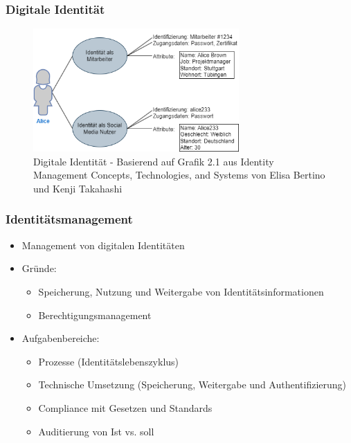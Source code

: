 \documentclass[11pt]{beamer}
\begin{document}
\begin{frame}
  \frametitle{Digitale Identität}
  \begin{figure}[H]
    \centering
    \includegraphics[width=0.7\textwidth]{assets/identity.png}
    \caption{Digitale Identität - Basierend auf Grafik 2.1 aus \glqq{}Identity Management Concepts, Technologies, and Systems\grqq{} von Elisa Bertino und Kenji Takahashi}
  \end{figure}
\end{frame}
\begin{frame}
  \frametitle{Identitätsmanagement}
  \begin{itemize}
    \item Management von digitalen Identitäten
    \item Gründe:
          \begin{itemize}
            \item Speicherung, Nutzung und Weitergabe von Identitätsinformationen
            \item Berechtigungsmanagement
          \end{itemize}
    \item Aufgabenbereiche:
          \begin{itemize}
            \item Prozesse (Identitätslebenszyklus)
            \item Technische Umsetzung (Speicherung, Weitergabe und Authentifizierung)~
            \item Compliance mit Gesetzen und Standards~
            \item Auditierung von Ist vs. soll~
          \end{itemize}
  \end{itemize}
\end{frame}
\end{document}
